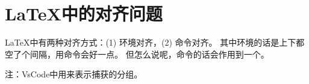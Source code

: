 \section{LaTeX中的对齐问题}

\LaTeX 中有两种对齐方式：(1) 环境对齐，(2) 命令对齐。
其中环境的话是上下都空了个间隔，用命令会好一点。
但怎么说呢，命令的话会作用到一个。

注：VsCode中用来表示捕获的分组。
